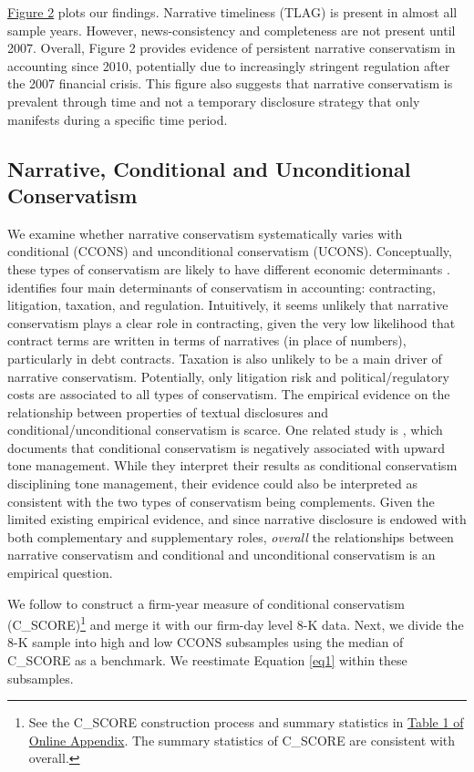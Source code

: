 \documentclass[letterpaper,12pt]{article}
\begin{document}
\begin{spacing}{1.5}
\hyperref[fig2]{Figure 2} plots our findings. Narrative timeliness (TLAG) is present in almost all sample years. However, news-consistency and completeness are not present until 2007. Overall, Figure 2 provides evidence of persistent narrative conservatism in accounting since 2010, potentially due to increasingly stringent regulation after the 2007 financial crisis. This figure also suggests that narrative conservatism is prevalent through time and not a temporary disclosure strategy that only manifests during a specific time period.

\subsection{Narrative, Conditional and Unconditional Conservatism}
\noindent We examine whether narrative conservatism systematically varies with conditional (CCONS) and unconditional conservatism (UCONS). Conceptually, these types of conservatism are likely to have different economic determinants \cite{garcialaraEconomicDeterminantsConditional2009,qiangEffectsContractingLitigation2007}.  identifies four main determinants of conservatism in accounting: contracting, litigation, taxation, and regulation. Intuitively, it seems unlikely that narrative conservatism plays a clear role in contracting, given the very low likelihood that contract terms are written in terms of narratives (in place of numbers), particularly in debt contracts. Taxation is also unlikely to be a main driver of narrative conservatism. Potentially, only litigation risk and political/regulatory costs are associated to all types of conservatism. The empirical evidence on the relationship between properties of textual disclosures and conditional/unconditional conservatism is scarce. One related study is , which documents that conditional conservatism is negatively associated with upward tone management. While they interpret their results as conditional conservatism disciplining tone management, their evidence could also be interpreted as consistent with the two types of conservatism being complements. Given the limited existing empirical evidence, and since narrative disclosure is endowed with both complementary and supplementary roles, \textit{overall} the relationships between narrative conservatism and conditional and unconditional conservatism is an empirical question. 

We follow  to construct a firm-year measure of conditional conservatism (C\_SCORE)\footnote{See the C\_SCORE construction process and summary statistics in \hyperref[OAT1]{Table 1 of Online Appendix}. The summary statistics of C\_SCORE are consistent with  overall. } and merge it with our firm-day level 8-K data. Next, we divide the 8-K sample into high and low CCONS subsamples using the median of C\_SCORE as a benchmark. We reestimate Equation \eqref{eq1} within these subsamples.


\end{spacing}
\end{document}
